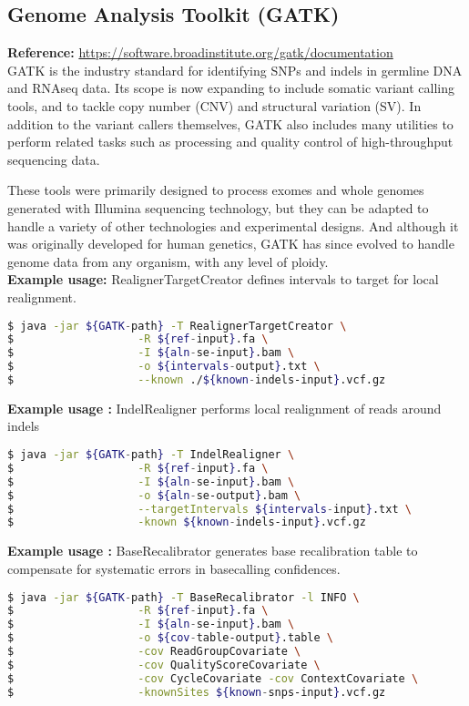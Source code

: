 \documentclass[8pt]{article}
\begin{document}
\subsection*{Genome Analysis Toolkit (GATK)}
\textbf{Reference:} \url{https://software.broadinstitute.org/gatk/documentation}\\
GATK is the industry standard for identifying SNPs and indels in germline DNA and RNAseq data. Its scope is now expanding to include somatic variant calling tools, and to tackle copy number (CNV) and structural variation (SV). In addition to the variant callers themselves, GATK also includes many utilities to perform related tasks such as processing and quality control of high-throughput sequencing data.

These tools were primarily designed to process exomes and whole genomes generated with Illumina sequencing technology, but they can be adapted to handle a variety of other technologies and experimental designs. And although it was originally developed for human genetics, GATK has since evolved to handle genome data from any organism, with any level of ploidy.\\
\textbf{Example usage:} RealignerTargetCreator defines intervals to target for local realignment.
\begin{lstlisting}[language=bash]
$ java -jar ${GATK-path} -T RealignerTargetCreator \
$					-R ${ref-input}.fa \
$					-I ${aln-se-input}.bam \
$					-o ${intervals-output}.txt \
$					--known ./${known-indels-input}.vcf.gz
\end{lstlisting}
\textbf{Example usage :} IndelRealigner performs local realignment of reads around indels
\begin{lstlisting}[language=bash]
$ java -jar ${GATK-path} -T IndelRealigner \
$					-R ${ref-input}.fa \
$					-I ${aln-se-input}.bam \
$					-o ${aln-se-output}.bam \
$					--targetIntervals ${intervals-input}.txt \
$					-known ${known-indels-input}.vcf.gz
\end{lstlisting}
\textbf{Example usage :} BaseRecalibrator generates base recalibration table to compensate for systematic errors in basecalling confidences.
\begin{lstlisting}[language=bash]
$ java -jar ${GATK-path} -T BaseRecalibrator -l INFO \
$					-R ${ref-input}.fa \
$					-I ${aln-se-input}.bam \
$					-o ${cov-table-output}.table \
$					-cov ReadGroupCovariate \
$					-cov QualityScoreCovariate \
$					-cov CycleCovariate -cov ContextCovariate \
$					-knownSites ${known-snps-input}.vcf.gz
\end{lstlisting}
\end{document}
